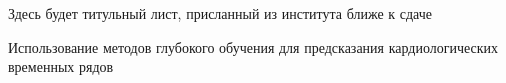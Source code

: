 Здесь будет титульный лист, присланный из института ближе к сдаче

Использование методов глубокого обучения для предсказания кардиологических временных рядов